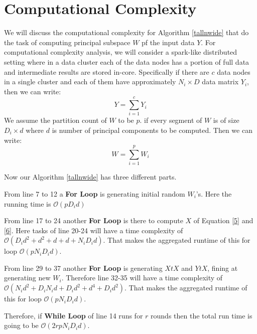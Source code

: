 \documentclass[12pt,notitlepage,oneside]{report}
\begin{document}
\section{Computational Complexity}
We will discuss the computational complexity for Algorithm \ref{tallnwide} that do the task of computing principal subspace $W$ pf the input data $Y$. For computational complexity analysis, we will consider a spark-like \cite{spark} distributed setting where in a data cluster each of the data nodes has a portion of full data and intermediate results are stored in-core. Specifically if there are $c$ data nodes in a single cluster and each of them have approximately $N_i \times D$ data matrix $Y_i$, then we can write:
 $$Y = \sum _{i=1}^c Y_i$$
We assume the partition count of $W$ to be $p$. if every segment of $W$ is of size $D_i \times d$ where $d$ is number of principal components to be computed. Then we can write:
$$W = \sum _{i=1}^p W_i$$

Now our Algorithm \ref{tallnwide} has three different parts.

From line 7 to 12 a \textbf{For Loop} is generating initial random $W_i$'s. Here the running time is $\mathcal{O}(pD_id)$

From line 17 to 24 another \textbf{For Loop} is there to compute $X$ of Equation \ref{5} and \ref{6}. Here tasks of line 20-24 will have a time complexity of $\mathcal{O}(D_id^2+d^2+d+d+N_iD_id)$. That makes the aggregated runtime of this for loop $\mathcal{O}(pN_iD_id)$.

From line 29 to 37 another \textbf{For Loop} is generating $XtX$ and $YtX$, fining at generating new $W_i$. Therefore line 32-35 will have a time complexity of $\mathcal{O}(N_id^2 + D_iN_id+D_id^2+d^4 + D_id^2)$. That makes the aggregated runtime of this for loop $\mathcal{O}(pN_iD_id)$.

Therefore, if \textbf{While Loop} of line 14 runs for $r$ rounds then the total run time is going to be $\mathcal{O}(2rpN_iD_id)$.
\end{document}
